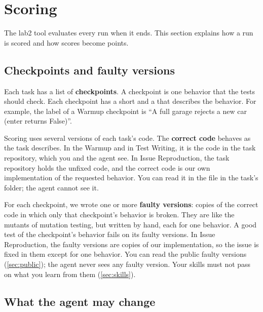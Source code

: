 \documentclass[letterpaper,11pt]{article}
\begin{document}
\section{Scoring}
\label{sec:scoring}

The lab2 tool evaluates every run when it ends. This section explains
how a run is scored and how scores become points.

\subsection{Checkpoints and faulty versions}
\label{sec:checkpoints}

Each task has a list of \textbf{checkpoints}. A checkpoint is one behavior that
the tests should check. Each checkpoint has a short  and a 
that describes the behavior. For example, the label of a Warmup checkpoint is ``A full garage rejects a new car (enter
returns False)''.

Scoring uses several versions of each task's code. The \textbf{correct code}
behaves as the task describes. In the Warmup and in Test Writing, it is the code in
the task repository, which you and the agent see. In Issue Reproduction, the
task repository holds the unfixed code, and the correct code is our own
implementation of the requested behavior. You can read it in the file
 in the task's folder; the agent cannot see it.

For each checkpoint, we wrote one or more \textbf{faulty versions}: copies of
the correct code in which only that checkpoint's behavior is broken. They are
like the mutants of mutation testing, but written by hand, each for one
behavior. A good test of the checkpoint's behavior fails on its faulty versions. In
Issue Reproduction, the faulty versions are copies of our implementation, so
the issue is fixed in them except for one behavior. You can read the public
faulty versions (\autoref{sec:public}); the agent never sees any faulty
version. Your skills must not pass on what you learn from them
(\autoref{sec:skills}).

\subsection{What the agent may change}
\label{sec:maychange}
\end{document}
